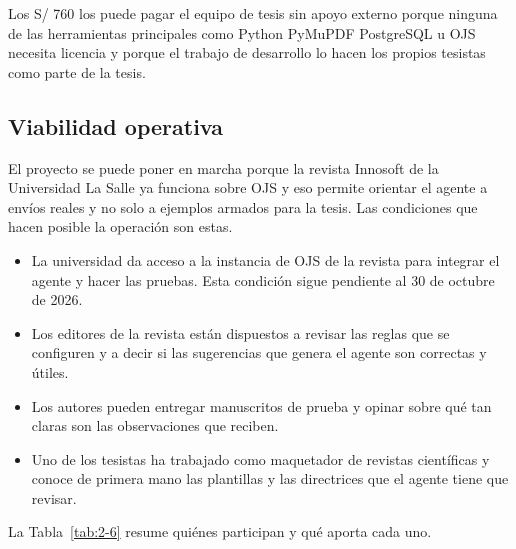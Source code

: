 Los S/ 760 los puede pagar el equipo de tesis sin apoyo externo porque ninguna de las herramientas principales como Python PyMuPDF PostgreSQL u OJS necesita licencia y porque el trabajo de desarrollo lo hacen los propios tesistas como parte de la tesis.

\subsection{Viabilidad operativa}

El proyecto se puede poner en marcha porque la revista Innosoft de la Universidad La Salle ya funciona sobre OJS y eso permite orientar el agente a envíos reales y no solo a ejemplos armados para la tesis. Las condiciones que hacen posible la operación son estas.

\begin{itemize}
  \item La universidad da acceso a la instancia de OJS de la revista para integrar el agente y hacer las pruebas. Esta condición sigue pendiente al 30 de octubre de 2026.
  \item Los editores de la revista están dispuestos a revisar las reglas que se configuren y a decir si las sugerencias que genera el agente son correctas y útiles.
  \item Los autores pueden entregar manuscritos de prueba y opinar sobre qué tan claras son las observaciones que reciben.
  \item Uno de los tesistas ha trabajado como maquetador de revistas científicas y conoce de primera mano las plantillas y las directrices que el agente tiene que revisar.
\end{itemize}

La Tabla~\ref{tab:2-6} resume quiénes participan y qué aporta cada uno.


